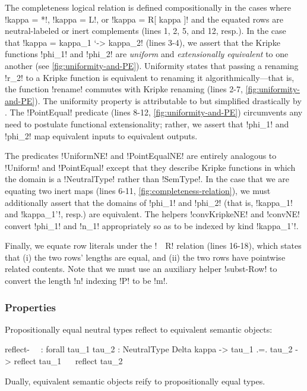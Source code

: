 \documentclass[sigplan,10pt,anonymous,review]{acmart}\settopmatter{printfolios=true,printccs=false,printacmref=false}
\begin{document}
The completeness logical relation is defined compositionally in the cases where !kappa = *!, !kappa = L!, or !kappa = R[ kappa ]! and the equated rows are neutral-labeled or inert complements (lines 1, 2, 5, and 12, resp.). In the case that !kappa = kappa_1 `-> kappa_2! (lines 3-4), we assert that the Kripke functions !phi_1! and !phi_2! are \emph{uniform} and \emph{extensionally equivalent} to one another (see \cref{fig:uniformity-and-PE}). Uniformity states that passing a renaming !r_2! to a Kripke function is equivalent to renaming it algorithmically---that is, the function !rename! commutes with Kripke renaming (lines 2-7, \cref{fig:uniformity-and-PE}). The uniformity property is attributable to \citet{AllaisBM13} but simplified drastically by \citet{ChapmanKNW19}. The !PointEqual! predicate (lines 8-12, \cref{fig:uniformity-and-PE}) circumvents any need to postulate functional extensionality; rather, we assert that !phi_1! and !phi_2! map equivalent inputs to equivalent outputs.

The predicates !UniformNE! and !PointEqualNE! are entirely analogous to !Uniform! and !PointEqual! except that they describe Kripke functions in which the domain is a !NeutralType! rather than !SemType!. In the case that we are equating two inert maps (lines 6-11, \cref{fig:completeness-relation}), we must additionally assert that the domains of !phi_1! and !phi_2! (that is, !kappa_1! and !kappa_1'!, resp.) are equivalent. The helpers !convKripkeNE! and !convNE! convert !phi_1! and !n_1! appropriately so as to be indexed by kind !kappa_1'!.

Finally, we equate row literals under the !~~R! relation (lines 16-18), which states that (i) the two rows' lengths are equal, and (ii) the two rows have pointwise related contents.  Note that we must use an auxiliary helper !subst-Row! to convert the length !n! indexing !P! to be !m!.

\subsubsection{Properties}

Propositionally equal neutral types reflect to equivalent semantic objects: 

\begin{agda}
reflect-~~ : forall {tau_1 tau_2 : NeutralType Delta kappa} -> 
             tau_1 .=. tau_2 -> reflect tau_1 ~~ reflect tau_2
\end{agda}

\Ni Dually, equivalent semantic objects reify to propositionally equal types. 
\end{document}
